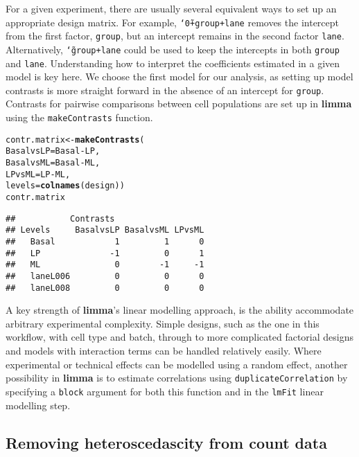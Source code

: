 \documentclass[10pt,a4paper]{extarticle}\usepackage[]{graphicx}\usepackage[]{color}
\makeatletter
\newcommand{\hlopt}[1]{\textcolor[rgb]{0,0,0}{#1}}%
\newcommand{\hlstd}[1]{\textcolor[rgb]{0.345,0.345,0.345}{#1}}%
\newcommand{\hlkwb}[1]{\textcolor[rgb]{0.69,0.353,0.396}{#1}}%
\newcommand{\hlkwc}[1]{\textcolor[rgb]{0.333,0.667,0.333}{#1}}%
\newcommand{\hlkwd}[1]{\textcolor[rgb]{0.737,0.353,0.396}{\textbf{#1}}}%
\newenvironment{kframe}{%
 \def\at@end@of@kframe{}%
 \ifinner\ifhmode%
  \def\at@end@of@kframe{\end{minipage}}%
  \begin{minipage}{\columnwidth}%
 \fi\fi%
 \def\FrameCommand##1{\hskip\@totalleftmargin \hskip-\fboxsep
 \colorbox{shadecolor}{##1}\hskip-\fboxsep
     \hskip-\linewidth \hskip-\@totalleftmargin \hskip\columnwidth}%
 \MakeFramed {\advance\hsize-\width
   \@totalleftmargin\z@ \linewidth\hsize
   \@setminipage}}%
 {\par\unskip\endMakeFramed%
 \at@end@of@kframe}
\newenvironment{knitrout}{}{} %
\makeatother
\begin{document}
For a given experiment, there are usually several equivalent ways to set up an appropriate design matrix. 
For example, \texttt{\char`\~0+group+lane} removes the intercept from the first factor, \texttt{group}, but an intercept remains in the second factor \texttt{lane}. 
Alternatively, \texttt{\char`\~group+lane} could be used to keep the intercepts in both \texttt{group} and \texttt{lane}. 
Understanding how to interpret the coefficients estimated in a given model is key here. 
We choose the first model for our analysis, as setting up model contrasts is more straight forward in the absence of an intercept for \texttt{group}. Contrasts for pairwise comparisons between cell populations are set up in \textbf{limma} using the \texttt{makeContrasts} function. 
\begin{knitrout}
\color{fgcolor}\begin{kframe}
\begin{alltt}
\hlstd{contr.matrix} \hlkwb{<-} \hlkwd{makeContrasts}\hlstd{(}
   \hlkwc{BasalvsLP} \hlstd{= Basal}\hlopt{-}\hlstd{LP,}
   \hlkwc{BasalvsML} \hlstd{= Basal} \hlopt{-} \hlstd{ML,}
   \hlkwc{LPvsML} \hlstd{= LP} \hlopt{-} \hlstd{ML,}
   \hlkwc{levels} \hlstd{=} \hlkwd{colnames}\hlstd{(design))}
\hlstd{contr.matrix}
\end{alltt}
\begin{verbatim}
##           Contrasts
## Levels     BasalvsLP BasalvsML LPvsML
##   Basal            1         1      0
##   LP              -1         0      1
##   ML               0        -1     -1
##   laneL006         0         0      0
##   laneL008         0         0      0
\end{verbatim}
\end{kframe}
\end{knitrout}

A key strength of \textbf{limma}'s linear modelling approach, is the ability accommodate arbitrary experimental complexity. Simple designs, such as the one in this workflow, with cell type and batch, through to more complicated factorial designs and models with interaction terms can be handled relatively easily. Where experimental or technical effects can be modelled using a random effect, another possibility in \textbf{limma} is to estimate correlations using \texttt{duplicateCorrelation} by specifying a \texttt{block} argument for both this function and in the \texttt{lmFit} linear modelling step.


\subsection*{Removing heteroscedascity from count data} 
\end{document}
